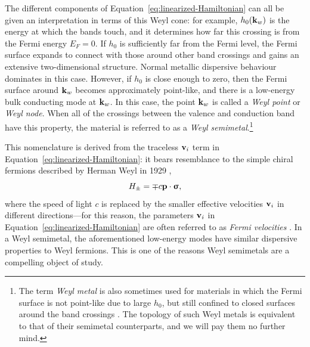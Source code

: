The different components of Equation~\eqref{eq:linearized-Hamiltonian} can all be given an interpretation in terms of this Weyl cone: for example, $h_0(\vb{k}_w)$ is the energy at which the bands touch, and it determines how far this crossing is from the Fermi energy $E_F = 0$. If $h_0$ is sufficiently far from the Fermi level, the Fermi surface expands to connect with those around other band crossings and gains an extensive two-dimensional structure. Normal metallic dispersive behaviour dominates in this case. However, if $h_0$ is close enough to zero, then the Fermi surface around $\vb{k}_w$ becomes approximately point-like, and there is a low-energy bulk conducting mode at $\vb{k}_w$. In this case, the point $\vb{k}_w$ is called a \emph{Weyl point} or \emph{Weyl node}. When all of the crossings between the valence and conduction band have this property, the material is referred to as a \emph{Weyl semimetal}.\footnote{
	The term \emph{Weyl metal} is also sometimes used for materials in which the Fermi surface is not point-like due to large $h_0$, but still confined to closed surfaces around the band crossings \cite{Burkov_Weyl-metals}. The topology of such Weyl metals is equivalent to that of their semimetal counterparts, and we will pay them no further mind.}

This nomenclature is derived from the traceless $\vb{v}_i$ term in Equation~\eqref{eq:linearized-Hamiltonian}: it bears resemblance to the simple chiral fermions described by Herman Weyl in 1929 \cite{Weyl_fermions},
\begin{equation*}
	H_\pm = \mp c\vb{p}\cdot\bm{\upsigma},
\end{equation*}
where the speed of light $c$ is replaced by the smaller effective velocities $\vb{v}_i$ in different directions---for this reason, the parameters $\vb{v}_i$ in Equation~\eqref{eq:linearized-Hamiltonian} are often referred to as \emph{Fermi velocities} \cite{Wang_ideal-Weyl}. In a Weyl semimetal, the aforementioned low-energy modes have similar dispersive properties to Weyl fermions. This is one of the reasons Weyl semimetals are a compelling object of study.


